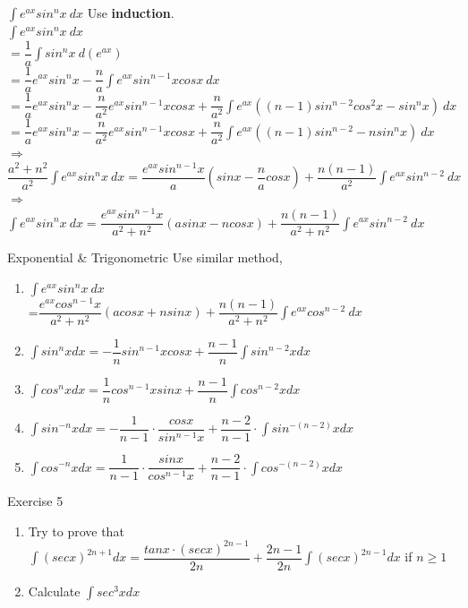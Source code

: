 \begin{frame}{$\int e^{ax}sin^nx\ dx$}
    \small
    Use \textbf{induction}.\\
    \bigskip
    $\int e^{ax}sin^nx\ dx$\\
    $=\dfrac{1}{a}\int sin^nx\ d(e^{ax})$\\
    $=\dfrac{1}{a}e^{ax}sin^nx-\dfrac{n}{a}\int e^{ax}sin^{n-1}xcosx\ dx$\\
    $= \dfrac{1}{a}e^{ax}sin^nx-\dfrac{n}{a^2} e^{ax}sin^{n-1}xcosx+\dfrac{n}{a^2}\int e^{ax}((n-1)sin^{n-2}cos^2x-sin^nx)\ dx$\\ $=\dfrac{1}{a}e^{ax}sin^nx-\dfrac{n}{a^2} e^{ax}sin^{n-1}xcosx+\dfrac{n}{a^2}\int e^{ax}((n-1)sin^{n-2}-nsin^nx)\ dx$\\
    \bigskip
    $\Rightarrow$\\
    \bigskip
    $\dfrac{a^2+n^2}{a^2}\int e^{ax}sin^nx\ dx=\dfrac{e^{ax}sin^{n-1}x}{a}(sinx-\dfrac{n}{a} cosx)+\dfrac{n(n-1)}{a^2}\int e^{ax}sin^{n-2}\ dx$\\
    \bigskip
    $\Rightarrow$\\
    \bigskip
    $\int e^{ax}sin^nx\ dx=\dfrac{e^{ax}sin^{n-1}x}{a^2+n^2}(asinx-ncosx)+\dfrac{n(n-1)}{a^2+n^2}\int e^{ax}sin^{n-2}\ dx$
    \normalsize

\end{frame}

\begin{frame}{Exponential \& Trigonometric}
    Use similar method,
    \begin{enumerate}
        \item $\int e^{ax}sin^nx\ dx$\\=$\dfrac{e^{ax}cos^{n-1}x}{a^2+n^2}(acosx+nsinx)+\dfrac{n(n-1)}{a^2+n^2}\int e^{ax}cos^{n-2}\ dx$
        \item $\int sin^nxdx=-\dfrac{1}{n}sin^{n-1}xcosx+\dfrac{n-1}{n}\int sin^{n-2}xdx$
        \item $\int cos^nxdx=\dfrac{1}{n}cos^{n-1}xsinx+\dfrac{n-1}{n}\int cos^{n-2}xdx$
        \item $\int sin^{-n}xdx=-\dfrac{1}{n-1}\cdot\dfrac{cosx}{sin^{n-1}x}+\dfrac{n-2}{n-1}\cdot\int sin^{-(n-2)}xdx$
        \item $\int cos^{-n}xdx=\dfrac{1}{n-1}\cdot\dfrac{sinx}{cos^{n-1}x}+\dfrac{n-2}{n-1}\cdot\int cos^{-(n-2)}xdx$
    \end{enumerate}
\end{frame}



\begin{frame}{Exercise 5}
    \begin{enumerate}
        \item Try to prove that $\int(secx)^{2n+1}dx=\dfrac{tanx\cdot(secx)^{2n-1}}{2n}+\dfrac{2n-1}{2n}\int(secx)^{2n-1}dx$ if $n\geq1$
        \item Calculate $\int sec^3xdx$
    \end{enumerate}
\end{frame}

